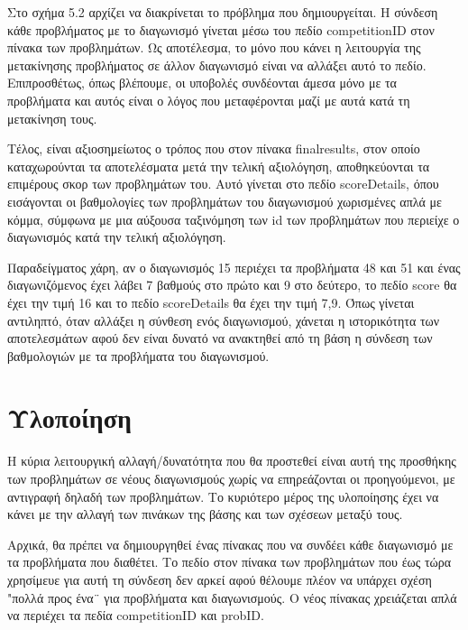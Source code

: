 \documentclass[diploma]{softlab-thesis}
\begin{document}
\bigskip

Στο σχήμα 5.2 αρχίζει να διακρίνεται το πρόβλημα που δημιουργείται. Η σύνδεση
κάθε προβλήματος με το διαγωνισμό γίνεται μέσω του πεδίο competitionID στον πίνακα
των προβλημάτων. Ως αποτέλεσμα, το μόνο που κάνει η λειτουργία της μετακίνησης
προβλήματος σε άλλον διαγωνισμό είναι να αλλάξει αυτό το πεδίο. Επιπροσθέτως,
όπως βλέπουμε, οι υποβολές συνδέονται άμεσα μόνο με τα προβλήματα και αυτός
είναι ο λόγος που μεταφέρονται μαζί με αυτά κατά τη μετακίνηση τους.

\bigskip

Τέλος, είναι αξιοσημείωτος ο τρόπος που στον πίνακα finalresults, στον οποίο
καταχωρούνται τα αποτελέσματα μετά την τελική αξιολόγηση, αποθηκεύονται τα
επιμέρους σκορ των προβλημάτων του. Αυτό γίνεται στο πεδίο scoreDetails, όπου
εισάγονται οι βαθμολογίες των προβλημάτων του διαγωνισμού χωρισμένες απλά με
κόμμα, σύμφωνα με μια αύξουσα ταξινόμηση των id των προβλημάτων που περιείχε ο
διαγωνισμός κατά την τελική αξιολόγηση.

\bigskip

Παραδείγματος χάρη, αν ο διαγωνισμός 15 περιέχει τα προβλήματα 48 και 51 και ένας
διαγωνιζόμενος έχει λάβει 7 βαθμούς στο πρώτο και 9 στο δεύτερο, το πεδίο score θα
έχει την τιμή 16 και το πεδίο scoreDetails θα έχει την τιμή 7,9. Όπως γίνεται
αντιληπτό, όταν αλλάξει η σύνθεση ενός διαγωνισμού, χάνεται η ιστορικότητα των
αποτελεσμάτων αφού δεν είναι δυνατό να ανακτηθεί από τη βάση η σύνδεση των
βαθμολογιών με τα προβλήματα του διαγωνισμού.

\bigskip

\section{Υλοποίηση}

Η κύρια λειτουργική αλλαγή/δυνατότητα που θα προστεθεί είναι αυτή της προσθήκης
των προβλημάτων σε νέους διαγωνισμούς χωρίς να επηρεάζονται οι προηγούμενοι, με
αντιγραφή δηλαδή των προβλημάτων. Το κυριότερο μέρος της υλοποίησης έχει να κάνει
με την αλλαγή των πινάκων της βάσης και των σχέσεων μεταξύ τους.

\bigskip

Αρχικά, θα πρέπει να δημιουργηθεί ένας πίνακας που να συνδέει κάθε διαγωνισμό
με τα προβλήματα που διαθέτει. Το πεδίο στον πίνακα των προβλημάτων που έως
τώρα χρησίμευε για αυτή τη σύνδεση δεν αρκεί αφού θέλουμε πλέον να υπάρχει
σχέση "πολλά προς ένα¨ για προβλήματα και διαγωνισμούς. Ο νέος πίνακας
χρειάζεται απλά να περιέχει τα πεδία competitionID και probID.
\end{document}
